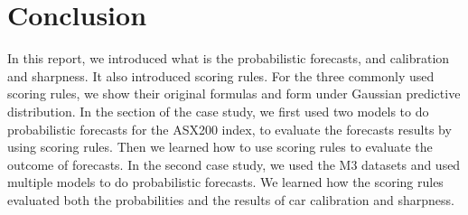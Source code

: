 \documentclass{monashthesis}
\theoremstyle{definition}
\theoremstyle{definition}
\theoremstyle{definition}
\theoremstyle{remark}
\begin{document}
\chapter{Conclusion}\label{conclusion}

In this report, we introduced what is the probabilistic forecasts, and
calibration and sharpness. It also introduced scoring rules. For the
three commonly used scoring rules, we show their original formulas and
form under Gaussian predictive distribution. In the section of the case
study, we first used two models to do probabilistic forecasts for the
ASX200 index, to evaluate the forecasts results by using scoring rules.
Then we learned how to use scoring rules to evaluate the outcome of
forecasts. In the second case study, we used the M3 datasets and used
multiple models to do probabilistic forecasts. We learned how the
scoring rules evaluated both the probabilities and the results of car
calibration and sharpness.

\printbibliography[heading=bibintoc]
\end{document}
